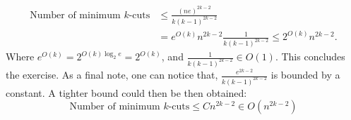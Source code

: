 \documentclass[11pt]{article}
\begin{document}
\begin{enumerate}
\begin{align*}
        \text{Number of minimum $k$-cuts} &\leq \frac{(ne)^{2k-2}}{k(k-1)^{2k-2}}\\
        & = e^{O(k)}n^{2k-2}\frac{1}{k(k-1)^{2k-2}} \leq 2^{O(k)}n^{2k-2}.
    \end{align*}
    Where $e^{O(k)} = 2^{O(k)\log_2e} = 2^{O(k)}$, and $\frac{1}{k(k-1)^{2k-2}} \in O(1)$. This concludes the exercise. As a final note, one can notice that, $\frac{e^{2k-2}}{k(k-1)^{2k-2}}$ is bounded by a constant. A tighter bound could then be then obtained:
    \begin{equation*}
        \text{Number of minimum $k$-cuts} \leq C n^{2k-2} \in O(n^{2k-2})
    \end{equation*} 
\end{enumerate}
\end{document}
